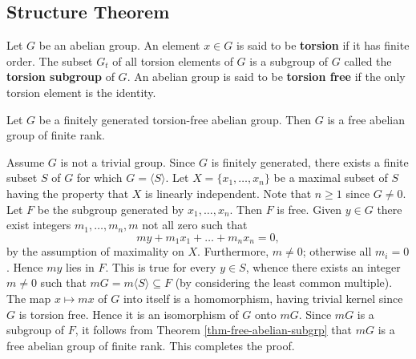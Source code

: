 \subsection{Structure Theorem}
\begin{definition}
	Let $G$ be an abelian group. An element $x \in G$ is said to be \textbf{torsion} if it has finite order. The subset $G_t$ of all torsion elements of $G$ is a subgroup of $G$ called the \textbf{torsion subgroup} of $G$.  An abelian group is said to be \textbf{torsion free} if the only torsion element is the identity.
\end{definition}

\begin{lemma} \label{lemma-FGAG-torsion-free}
	Let $G$ be a finitely generated torsion-free abelian group. Then $G$ is a free abelian group of finite rank.
\end{lemma}
\begin{sketch}
	Assume $G$ is not a trivial group. Since $G$ is finitely generated, there exists a finite subset $S$ of $G$ for which $G = \langle S\rangle$. Let $X = \{x_1, \dots, x_n\}$ be a maximal subset of $S$ having the property that $X$ is linearly independent. Note that $n \ge 1$ since $G \neq 0$. Let $F$ be the subgroup generated by $x_1, \dots, x_n$. Then $F$ is free. Given $y \in G$ there exist integers $m_1, \dots, m_n, m$ not all zero such that
	$$ my + m_1 x_1 + \dots + m_n x_n = 0, $$
	by the assumption of maximality on $X$. Furthermore, $m \neq 0$; otherwise all $m_i = 0$. Hence $my$ lies in $F$. This is true for every $y\in S$, whence there exists an integer $m \neq 0$ such that $mG = m\langle S\rangle \subseteq F$ (by considering the least common multiple). The map
	$ x \mapsto mx $
	of $G$ into itself is a homomorphism, having trivial kernel since $G$ is torsion free. Hence it is an isomorphism of $G$ onto $mG$. Since $mG$ is a subgroup of $F$, it follows from  Theorem \ref{thm-free-abelian-subgrp} that   $mG$ is a free abelian group of finite rank. This completes the proof.
\end{sketch}

